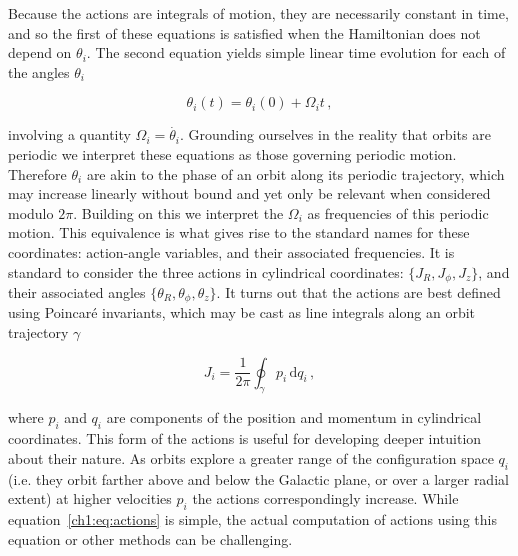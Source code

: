  Because the actions are integrals of motion, they are necessarily constant in time, and so the first of these equations is satisfied when the Hamiltonian does not depend on $\theta_{i}$. The second equation yields simple linear time evolution for each of the angles $\theta_{i}$ 

\begin{equation}
    \label{ch1:eq:angle-evolution}
    \theta_{i}(t) = \theta_{i}(0) + \Omega_{i}t\,,
\end{equation}

\noindent involving a quantity $\Omega_{i} = \dot{\theta_{i}}$. Grounding ourselves in the reality that orbits are periodic we interpret these equations as those governing periodic motion. Therefore $\theta_{i}$ are akin to the phase of an orbit along its periodic trajectory, which may increase linearly without bound and yet only be relevant when considered modulo $2\pi$. Building on this we interpret the $\Omega_{i}$ as frequencies of this periodic motion. This equivalence is what gives rise to the standard names for these coordinates: action-angle variables, and their associated frequencies. It is standard to consider the three actions in cylindrical coordinates: $\{J_{R}, J_{\phi}, J_{z}\}$, and their associated angles $\{\theta_{R}, \theta_{\phi}, \theta_{z}\}$. It turns out that the actions are best defined using Poincar\'{e} invariants, which may be cast as line integrals along an orbit trajectory $\gamma$ 

\begin{equation}
    \label{ch1:eq:actions}
    J_{i} = \frac{1}{2\pi}\oint_{\gamma} p_{i}\, \mathrm{d}q_{i}\,,
\end{equation}

\noindent where $p_{i}$ and $q_{i}$ are components of the position and momentum in cylindrical coordinates. This form of the actions is useful for developing deeper intuition about their nature. As orbits explore a greater range of the configuration space $q_{i}$ (i.e. they orbit farther above and below the Galactic plane, or over a larger radial extent) at higher velocities $p_{i}$ the actions correspondingly increase. While equation~\eqref{ch1:eq:actions} is simple, the actual computation of actions using this equation or other methods can be challenging.

